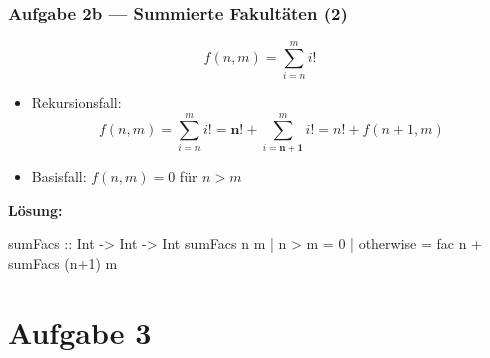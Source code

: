 \documentclass{beamer}
\begin{document}
	\begin{frame}[fragile] \frametitle{Aufgabe 2b --- Summierte Fakultäten (2)}
		\footnotesize
		\begin{equation*}
			f(n,m) = \sum_{i=n}^{m} i!
		\end{equation*}
		\begin{itemize}[leftmargin=*]
			\item Rekursionsfall: 
			\begin{equation*}
				f(n,m) = \sum_{i=n}^{m} i! = \boldsymbol{n}! + \sum_{i=\boldsymbol{n+1}}^{m} i! = n! + f(n+1,m) 
			\end{equation*}
			\item Basisfall: $f(n,m) = 0$ für $n > m$
		\end{itemize}
		\pause
		
		\textbf{Lösung:} \\[0.5em]
		\begin{codebox}
sumFacs :: Int -> Int -> Int
sumFacs n m
	| n > m = 0
	| otherwise = fac n + sumFacs (n+1) m
		\end{codebox}
	\end{frame}


	\section{Aufgabe 3}
	
\end{document}
